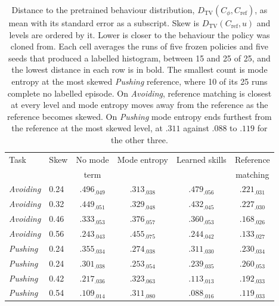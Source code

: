 \documentclass[preprint,12pt]{elsarticle}
\begin{document}
\begin{table}[t]
\caption{Distance to the pretrained behaviour distribution,
$D_{\mathrm{TV}}(C_\phi, C_{\mathrm{ref}})$, as mean with its standard error as
a subscript. Skew is $D_{\mathrm{TV}}(C_{\mathrm{ref}}, u)$ and levels are
ordered by it. Lower is closer to the behaviour the policy was cloned from.
Each cell averages the runs of five frozen policies and five seeds that
produced a labelled histogram, between 15 and 25 of 25, and the lowest distance
in each row is in bold. The smallest count is mode entropy at the most skewed
\emph{Pushing} reference, where 10 of its 25 runs complete no labelled episode.
On \emph{Avoiding}, reference matching is closest at every level and mode
entropy moves away from the reference as the reference becomes skewed. On
\emph{Pushing} mode entropy ends furthest from the reference at the most skewed
level, at $.311$ against $.088$ to $.119$ for the other three.}
\label{tab:main}
\small
\begin{tabular*}{\textwidth}{@{\extracolsep{\fill}}llcccc@{}}
\toprule
Task & Skew & No mode & Mode entropy & Learned skills & Reference \\
 &  & term &  &  & matching \\
\midrule
\emph{Avoiding} & 0.24 & $.496_{.049}$ & $.313_{.038}$ & $.479_{.056}$ & $\mathbf{.221}_{.031}$ \\
\emph{Avoiding} & 0.32 & $.449_{.051}$ & $.329_{.048}$ & $.432_{.045}$ & $\mathbf{.227}_{.030}$ \\
\emph{Avoiding} & 0.46 & $.333_{.053}$ & $.376_{.057}$ & $.360_{.053}$ & $\mathbf{.168}_{.026}$ \\
\emph{Avoiding} & 0.56 & $.243_{.043}$ & $.455_{.075}$ & $.244_{.042}$ & $\mathbf{.133}_{.027}$ \\
\midrule
\emph{Pushing} & 0.24 & $.355_{.034}$ & $.274_{.038}$ & $.311_{.030}$ & $\mathbf{.230}_{.034}$ \\
\emph{Pushing} & 0.24 & $.301_{.038}$ & $.253_{.054}$ & $\mathbf{.239}_{.035}$ & $.260_{.053}$ \\
\emph{Pushing} & 0.42 & $.217_{.036}$ & $.323_{.063}$ & $\mathbf{.113}_{.013}$ & $.192_{.033}$ \\
\emph{Pushing} & 0.54 & $.109_{.014}$ & $.311_{.080}$ & $\mathbf{.088}_{.016}$ & $.119_{.033}$ \\
\bottomrule
\end{tabular*}
\end{table}
\end{document}
